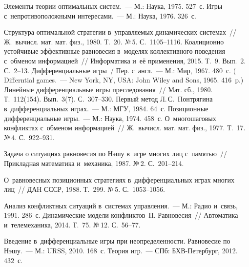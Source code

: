 \begin{multicols}{2}
{\small\frenchspacing
 {%
 \begin{thebibliography}{99}
 Элементы теории оптимальных сис\-тем.~--- М.: Наука, 1975. 
527~с.
 Игры с~непротивоположными интересами.~--- М.: Наука, 1976. 
326~с.

 Структура оптимальной стратегии в~управляемых 
динамических сис\-те\-мах~// Ж.~вычисл. мат. мат. 
физ., 1980. Т.~20. №\,5. С.~1105--1116.
 Коалиционно устойчивые эффективные равновесия в~моделях 
коллективного поведения с~обменом информацией~// Информатика и~её 
применения, 2015. Т.~9. Вып.~2. С.~2--13.
 Дифференциальные игры~/
Пер. с~англ.~--- М.: Мир, 1967. 480~с.
(
Differntial games.~--- New York, NY, USA: John Wiley and Sons, 1965. 416~p.)
 Линейные дифференциальные игры преследования~// 
Мат. сб., 1980. Т.~112(154). Вып.~3(7). С.~307--330.
 Первый метод Л.\,С.~Понтрягина в~дифференциальных 
играх.~--- М.: МГУ, 1984. 64~с.
 Позиционные дифференциальные  
игры.~--- М.: Наука, 1974. 458~с.
 О~многошаговых конфликтах с~обменом информацией~// 
Ж.~вычисл. мат. мат. физ., 1977. Т.~17. №\,4. 
С.~922--931.

 Задача о ситуациях равновесия по Нэшу в~игре многих лиц 
с~памятью~// Прикладная математика и~механика, 1987. №\,2. С.~201--214.

 О~равновесных позиционных стратегиях 
в~дифференциальных играх многих лиц~// ДАН СССР, 1988. Т.~299. №\,5.  
С.~1053--1056.

 Анализ конфликтных 
ситуаций в~сис\-те\-мах управ\-ле\-ния.~--- М.: Радио и~связь, 1991. 286~с. 
 Динамические модели конфликтов~II. 
Равновесия~// Автоматика и~телемеханика, 2014. Т.~75. №\,12. С.~56--77.



 Введение в~дифференциальные игры при неопределенности. 
Равновесие по Нэшу.~--- М.: URSS, 2010. 168~с.
 Теория игр.~--- СПб: БХВ-Петербург, 2012. 432~с.

 \end{thebibliography}

 }
 }

\end{multicols}

